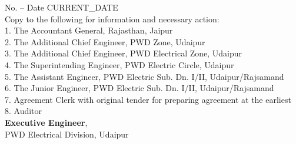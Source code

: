 \documentclass[a4paper]{article}
\begin{document}
No. -- \hspace{45mm} Date {CURRENT_DATE} \\
Copy to the following for information and necessary action: \\
1. The Accountant General, Rajasthan, Jaipur \\
2. The Additional Chief Engineer, PWD Zone, Udaipur \\
3. The Additional Chief Engineer, PWD Electrical Zone, Udaipur \\
4. The Superintending Engineer, PWD Electric Circle, Udaipur \\
5. The Assistant Engineer, PWD Electric Sub. Dn. I/II, Udaipur/Rajsamand \\
6. The Junior Engineer, PWD Electric Sub. Dn. I/II, Udaipur/Rajsamand \\
7. Agreement Clerk with original tender for preparing agreement at the earliest \\
8. Auditor \\

\textbf{Executive Engineer}, \\
PWD Electrical Division, Udaipur
\end{document}
